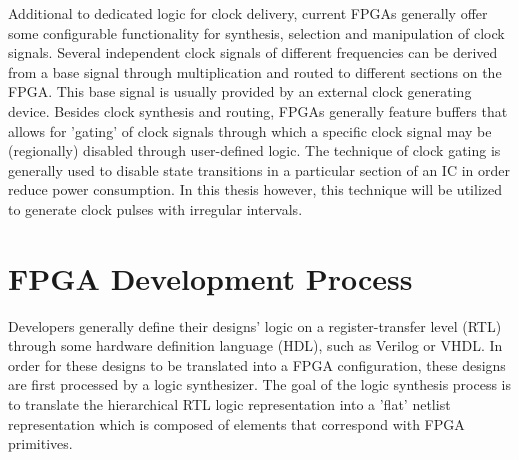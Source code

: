 \documentclass[main.tex]{subfiles}
\begin{document}
Additional to dedicated logic for clock delivery, current FPGAs generally offer some configurable functionality for synthesis, selection and manipulation of clock signals. Several independent clock signals of different frequencies can be derived from a base signal through multiplication and routed to different sections on the FPGA. This base signal is usually provided by an external clock generating device. Besides clock synthesis and routing, FPGAs generally feature buffers that allows for 'gating' of clock signals through which a specific clock signal may be (regionally) disabled through user-defined logic. The technique of clock gating is generally used to disable state transitions in a particular section of an IC in order reduce power consumption. In this thesis however, this technique will be utilized to generate clock pulses with irregular intervals.






\section{FPGA Development Process}

Developers generally define their designs' logic on a register-transfer level (RTL) through some hardware definition language (HDL), such as Verilog or VHDL. In order for these designs to be translated into a FPGA configuration, these designs are first processed by a logic synthesizer. The goal of the logic synthesis process is to translate the hierarchical RTL logic representation into a 'flat' netlist representation which is composed of elements that correspond with FPGA primitives.
\end{document}
